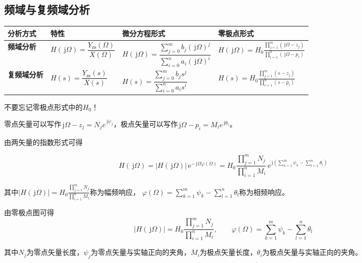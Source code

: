 \documentclass[UTF8,fontset=fandol,zihao=5]{ctexart}
\newcommand{\jj}{\,\mathrm{j}}
\newcommand{\ee}{\,\mathrm{e}}
\begin{document}
\subsection{频域与复频域分析}
\begin{center}
\begin{tabularx}{0.98\textwidth}{>{\bfseries}p{2cm}X X X}
\toprule
分析方式 & 特性 & 微分方程形式 & 零极点形式 \\
\midrule
频域分析 & 
$H(\jj \varOmega) = \dfrac{Y_{\mathrm{zs}}(\varOmega)}{X(\varOmega)}$ & 
$H(\jj \varOmega) = \dfrac{\displaystyle\sum_{j=0}^{m}b_j\left(\jj \varOmega\right)^j}{\displaystyle\sum_{i=0}^{n}a_i\left(\jj \varOmega\right)^i}$ &
$H(\jj \varOmega)=H_0\frac{\displaystyle\prod_{j=1}^{m}(\jj \varOmega-z_j)}{\displaystyle\prod_{i=1}^{n}(\jj \varOmega-p_i)}$ \\
复频域分析 & 
$H(s) = \dfrac{Y_{\mathrm{zs}}(s)}{X(s)}$ & 
$H(s) = \dfrac{\displaystyle\sum_{j=0}^{m}b_j s^j}{\displaystyle\sum_{i=0}^{n}a_i s^i}$ &
$H(s)=H_0\frac{\displaystyle\prod_{j=1}^{m}(s-z_j)}{\displaystyle\prod_{i=1}^{n}(s-p_i)}$ \\
\bottomrule
\end{tabularx}
\end{center}

\begin{methodbox}[【注意】]
  不要忘记零极点形式中的$H_0$！
\end{methodbox}

\begin{methodbox}[频域分析的其他零极点形式]
  零点矢量可以写作$\jj\varOmega-z_j=N_j e^{\jj\psi_j}$，极点矢量可以写作$\jj\varOmega-p_i=M_i e^{\jj\theta_i}$。
  
  由两矢量的指数形式可得
  
  \[
  H(\jj\varOmega) = \left|H(\jj\varOmega)\right|\ee^{-\jj\varOmega\varphi(\varOmega)} = H_0\frac{\displaystyle\prod_{j=1}^{m}N_j}{\displaystyle\prod_{i=1}^{n}M_i}\ee^{\displaystyle\jj\left(\displaystyle\sum_{k=1}^{m}\psi_k-\displaystyle\sum_{l=1}^{n}\theta_{l}\right)}
  \]

  其中$\left|H(\jj\varOmega)\right|= H_0\frac{\displaystyle\prod_{j=1}^{m}N_j}{\displaystyle\prod_{i=1}^{n}M_i}$称为幅频响应，
  $\displaystyle\varphi(\varOmega)=\displaystyle\sum_{k=1}^{m}\psi_k-\displaystyle\sum_{l=1}^{n}\theta_{l}$称为相频响应。
\end{methodbox}

\begin{methodbox}[由零极点图求幅频响应与相频响应]
  由零极点图可得
  \[
  \left|H(\jj\varOmega)\right|= H_0\frac{\displaystyle\prod_{j=1}^{m}N_j}{\displaystyle\prod_{i=1}^{n}M_i}
  ,\qquad
  \varphi(\varOmega)=\displaystyle\sum_{k=1}^{m}\psi_k-\displaystyle\sum_{l=1}^{n}\theta_{l}
  \]

  其中$N_j$为零点矢量长度，$\psi_j$为零点矢量与实轴正向的夹角，$M_i$为极点矢量长度，$\theta_i$为极点矢量与实轴正向的夹角。
  
\end{methodbox}
\end{document}
